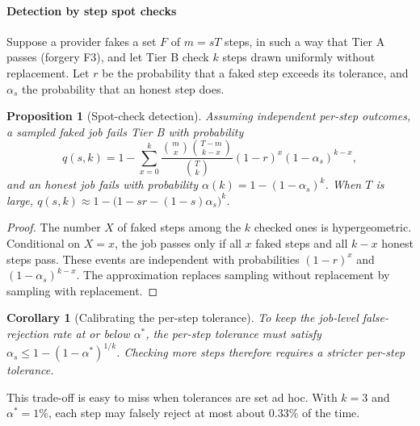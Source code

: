 \documentclass[preprint,review,12pt,authoryear]{elsarticle}
\newtheorem{proposition}{Proposition}
\newtheorem{corollary}{Corollary}
\theoremstyle{definition}
\begin{document}
\paragraph{Detection by step spot checks}
Suppose a provider fakes a set $F$ of $m=sT$ steps, in such a way that Tier A passes (forgery F3), and let Tier B check $k$ steps drawn uniformly without replacement. Let $r$ be the probability that a faked step exceeds its tolerance, and $\alpha_s$ the probability that an honest step does.

\begin{proposition}[Spot-check detection]\label{prop:spot}
Assuming independent per-step outcomes, a sampled faked job fails Tier B with probability
\begin{equation}
q(s,k)=1-\sum_{x=0}^{k}\frac{\binom{m}{x}\binom{T-m}{k-x}}{\binom{T}{k}}(1-r)^{x}(1-\alpha_s)^{k-x}, \label{eq:q}
\end{equation}
and an honest job fails with probability $\alpha(k)=1-(1-\alpha_s)^k$. When $T$ is large, $q(s,k)\approx1-\bigl(1-sr-(1-s)\alpha_s\bigr)^k$.
\end{proposition}
\begin{proof}
The number $X$ of faked steps among the $k$ checked ones is hypergeometric. Conditional on $X=x$, the job passes only if all $x$ faked steps and all $k-x$ honest steps pass. These events are independent with probabilities $(1-r)^x$ and $(1-\alpha_s)^{k-x}$. The approximation replaces sampling without replacement by sampling with replacement.
\end{proof}
\begin{corollary}[Calibrating the per-step tolerance]
To keep the job-level false-rejection rate at or below $\alpha^\ast$, the per-step tolerance must satisfy $\alpha_s\le1-(1-\alpha^\ast)^{1/k}$. Checking more steps therefore requires a stricter per-step tolerance.
\end{corollary}
This trade-off is easy to miss when tolerances are set ad hoc. With $k=3$ and $\alpha^\ast=1\%$, each step may falsely reject at most about $0.33\%$ of the time.
\end{document}

